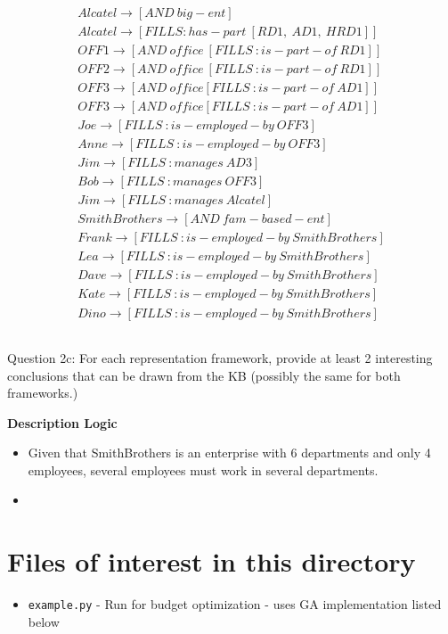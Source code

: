 \documentclass[11pt]{article}
\begin{document}
\begin{align*}
Alcatel \rightarrow [AND\ big-ent] \\
Alcatel \rightarrow [FILLS :has-part\ [RD1,\ AD1,\ HRD1]] \\ 
OFF1 \rightarrow [AND\ office\ [FILLS\ :is-part-of\ RD1]] \\
OFF2 \rightarrow [AND \ office\ [FILLS\ :is-part-of\ RD1]] \\
OFF3 \rightarrow [AND\ office [FILLS\ :is-part-of\ AD1]] \\
OFF3 \rightarrow [AND\ office [FILLS\ :is-part-of\ AD1]] \\
Joe \rightarrow [FILLS\ :is-employed-by\ OFF3] \\
Anne \rightarrow [FILLS\ :is-employed-by\ OFF3] \\
Jim \rightarrow [FILLS\ :manages\ AD3] \\ 
Bob \rightarrow [FILLS\ :manages\ OFF3] \\
Jim \rightarrow [FILLS\ :manages\ Alcatel] \\ 
SmithBrothers \rightarrow [AND\ fam-based-ent] \\
Frank \rightarrow [FILLS\ :is-employed-by\ SmithBrothers] \\ 
Lea \rightarrow [FILLS\ :is-employed-by\ SmithBrothers] \\ 
Dave \rightarrow [FILLS\ :is-employed-by\ SmithBrothers] \\ 
Kate \rightarrow [FILLS\ :is-employed-by\ SmithBrothers] \\ 
Dino \rightarrow [FILLS\ :is-employed-by\ SmithBrothers] 
\end{align*}
\subsection{}
Question 2c:
For each representation framework, provide at least 2 interesting conclusions that can be drawn from the KB (possibly the same for both frameworks.)

\textbf{Description Logic}
\begin{itemize}
\item Given that SmithBrothers is an enterprise with 6 departments and only 4 employees, several employees must work in several departments.
\item 
\end{itemize}

\section{Files of interest in this directory}
\begin{itemize}
\item \texttt{example.py} - Run for budget optimization - uses GA implementation listed below

\end{itemize}
\end{document}
